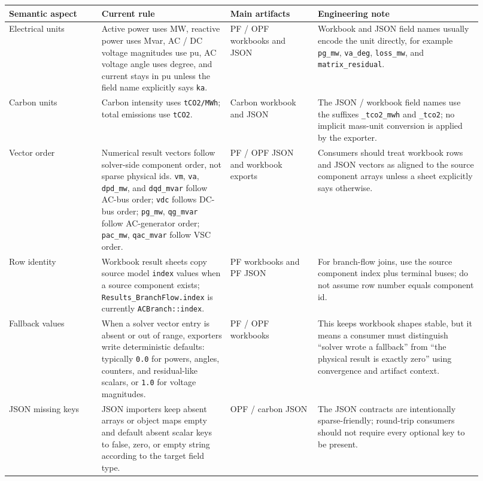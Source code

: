 \begin{longtable}{@{}L{0.18\linewidth}L{0.25\linewidth}L{0.17\linewidth}L{0.32\linewidth}@{}}
\toprule
Semantic aspect & Current rule & Main artifacts & Engineering note \\
\midrule
\endhead
Electrical units & Active power uses MW, reactive power uses Mvar, AC / DC voltage magnitudes use pu, AC voltage angle uses degree, and current stays in pu unless the field name explicitly says \texttt{ka}. & PF / OPF workbooks and JSON & Workbook and JSON field names usually encode the unit directly, for example \texttt{pg\_mw}, \texttt{va\_deg}, \texttt{loss\_mw}, and \texttt{matrix\_residual}. \\
Carbon units & Carbon intensity uses \texttt{tCO2/MWh}; total emissions use \texttt{tCO2}. & Carbon workbook and JSON & The JSON / workbook field names use the suffixes \texttt{\_tco2\_mwh} and \texttt{\_tco2}; no implicit mass-unit conversion is applied by the exporter. \\
Vector order & Numerical result vectors follow solver-side component order, not sparse physical ids.  \texttt{vm}, \texttt{va}, \texttt{dpd\_mw}, and \texttt{dqd\_mvar} follow AC-bus order; \texttt{vdc} follows DC-bus order; \texttt{pg\_mw}, \texttt{qg\_mvar} follow AC-generator order; \texttt{pac\_mw}, \texttt{qac\_mvar} follow VSC order. & PF / OPF JSON and workbook exports & Consumers should treat workbook rows and JSON vectors as aligned to the source component arrays unless a sheet explicitly says otherwise. \\
Row identity & Workbook result sheets copy source model \texttt{index} values when a source component exists; \texttt{Results\_BranchFlow.index} is currently \texttt{ACBranch::index}. & PF workbooks and PF JSON & For branch-flow joins, use the source component index plus terminal buses; do not assume row number equals component id. \\
Fallback values & When a solver vector entry is absent or out of range, exporters write deterministic defaults: typically \texttt{0.0} for powers, angles, counters, and residual-like scalars, or \texttt{1.0} for voltage magnitudes. & PF / OPF workbooks & This keeps workbook shapes stable, but it means a consumer must distinguish ``solver wrote a fallback'' from ``the physical result is exactly zero'' using convergence and artifact context. \\
JSON missing keys & JSON importers keep absent arrays or object maps empty and default absent scalar keys to false, zero, or empty string according to the target field type. & OPF / carbon JSON & The JSON contracts are intentionally sparse-friendly; round-trip consumers should not require every optional key to be present. \\

\end{longtable}
